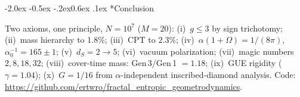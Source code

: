 \documentclass[aps,prl,twocolumn,superscriptaddress,nofootinbib,amsmath,amssymb,floatfix]{revtex4-2}
\makeatletter
\def\sec@upcase#1{\uppercase{#1}}
\renewcommand\section{\@startsection{section}{1}{\z@}%
  {-2.0ex \@plus -0.5ex \@minus -.2ex}{0.6ex \@plus .1ex}%
  {\normalfont\small\bfseries\centering\sec@upcase}}
\makeatother
\begin{document}
\section*{Conclusion}

Two axioms, one principle, $N = 10^7$ ($M{=}20$):
(i)~$g \leq 3$ by sign trichotomy;
(ii)~mass hierarchy to 1.8\%;
(iii)~CPT to $2.3\%$;
(iv)~$\alpha(1+\Omega) = 1/(8\pi)$, $\alpha^{-1}_0 = 165 \pm 1$;
(v)~$d_S = 2 \to 5$;
(vi)~vacuum polarization;
(vii)~magic numbers $2, 8, 18, 32$;
(viii)~cover-time mass: Gen\,3/Gen\,1 $= 1.18$;
(ix)~GUE rigidity ($\gamma = 1.04$);
(x)~$G = 1/16$ from $\alpha$-independent inscribed-diamond analysis.
Code: \url{https://github.com/ertwro/fractal_entropic_geometrodynamics}.


\end{document}
